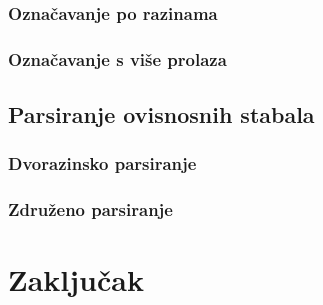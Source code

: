\documentclass[times, utf8, diplomski]{fer}
\begin{document}
\subsection{Označavanje po razinama}

\subsection{Označavanje s više prolaza}

\section{Parsiranje ovisnosnih stabala}

\subsection{Dvorazinsko parsiranje}

\subsection{Združeno parsiranje}

\chapter{Zaključak}








\nocite{daume06thesis}
\nocite{daume09searn}
\nocite{daume06searn-practice}
\nocite{daume15reductions}
\nocite{daume15lols}
\nocite{daume15rewrite}
\nocite{daume14lts}
\end{document}

